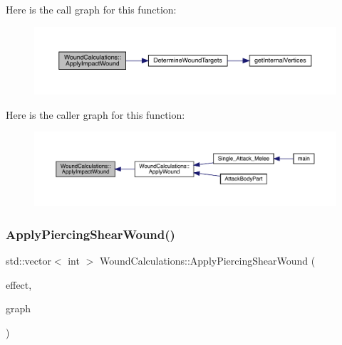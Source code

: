 Here is the call graph for this function\+:
\nopagebreak
\begin{figure}[H]
\begin{center}
\leavevmode
\includegraphics[width=350pt]{class_wound_calculations_a645dc9bb6dfc7d5fc20fc8e8b91fd430_cgraph}
\end{center}
\end{figure}
Here is the caller graph for this function\+:
\nopagebreak
\begin{figure}[H]
\begin{center}
\leavevmode
\includegraphics[width=350pt]{class_wound_calculations_a645dc9bb6dfc7d5fc20fc8e8b91fd430_icgraph}
\end{center}
\end{figure}
\mbox{\label{class_wound_calculations_ac763bba5d770b968ab68532b974d878d}} 
\subsubsection{\texorpdfstring{Apply\+Piercing\+Shear\+Wound()}{ApplyPiercingShearWound()}}
{\footnotesize\ttfamily std\+::vector$<$ int $>$ Wound\+Calculations\+::\+Apply\+Piercing\+Shear\+Wound (\begin{DoxyParamCaption}\item[{\mbox{\hyperlink{struct_applied_force_effect}{Applied\+Force\+Effect}} \&}]{effect,  }\item[{\mbox{\hyperlink{_body_graph_8hpp_ab01b157c2e143191570b012d275fbf0d}{Anatomy\+Graph}} \&}]{graph }\end{DoxyParamCaption})}

